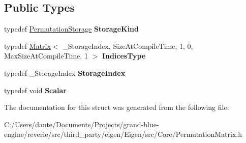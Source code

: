 \subsection*{Public Types}
\begin{DoxyCompactItemize}
\item 
\mbox{\label{struct_eigen_1_1internal_1_1traits_3_01_permutation_matrix_3_01_size_at_compile_time_00_01_max_sd0808d93099012556270f7c7cd36fcc5_aacb0bfda5e0099c12ba651125823f7ce}} 
typedef \mbox{\hyperlink{struct_eigen_1_1_permutation_storage}{Permutation\+Storage}} {\bfseries Storage\+Kind}
\item 
\mbox{\label{struct_eigen_1_1internal_1_1traits_3_01_permutation_matrix_3_01_size_at_compile_time_00_01_max_sd0808d93099012556270f7c7cd36fcc5_ae1a4a00b2b672bb90f5fa2865a685089}} 
typedef \mbox{\hyperlink{class_eigen_1_1_matrix}{Matrix}}$<$ \+\_\+\+Storage\+Index, Size\+At\+Compile\+Time, 1, 0, Max\+Size\+At\+Compile\+Time, 1 $>$ {\bfseries Indices\+Type}
\item 
\mbox{\label{struct_eigen_1_1internal_1_1traits_3_01_permutation_matrix_3_01_size_at_compile_time_00_01_max_sd0808d93099012556270f7c7cd36fcc5_a3b0de4f65dbfa61abb07e006b2961804}} 
typedef \+\_\+\+Storage\+Index {\bfseries Storage\+Index}
\item 
\mbox{\label{struct_eigen_1_1internal_1_1traits_3_01_permutation_matrix_3_01_size_at_compile_time_00_01_max_sd0808d93099012556270f7c7cd36fcc5_aed1bb3143b5cb628201bd7dab896a797}} 
typedef void {\bfseries Scalar}
\end{DoxyCompactItemize}


The documentation for this struct was generated from the following file\+:\begin{DoxyCompactItemize}
\item 
C\+:/\+Users/dante/\+Documents/\+Projects/grand-\/blue-\/engine/reverie/src/third\+\_\+party/eigen/\+Eigen/src/\+Core/Permutation\+Matrix.\+h\end{DoxyCompactItemize}
